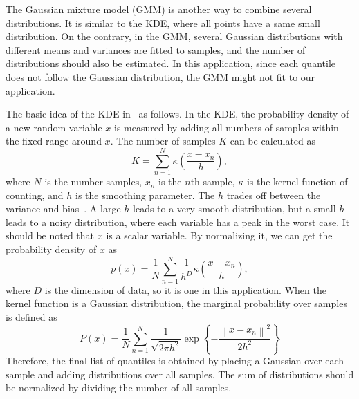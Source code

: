 \documentclass[journal]{IEEEtran} %
\begin{document}
The Gaussian mixture model (GMM) is another way to combine several distributions. It is similar to the KDE, where all points have a same small distribution. On the contrary, in the GMM, several Gaussian distributions with different means and variances are fitted to samples, and the number of distributions should also be estimated. In this application, since each quantile does not follow the Gaussian distribution, the GMM might not fit to our application.





The basic idea of the KDE in~\cite{Duda} as follows. In the KDE, the probability density of a new random variable $x$ is measured by adding all numbers of samples within the fixed range around $x$. The number of samples $K$ can be calculated as
\begin{equation}
\label{K}
K = \sum\limits_{n = 1}^N {\kappa  \left( {\frac{{x - {x_n}}}{h}} \right)},
\end{equation}
where $N$ is the number samples, $x_n$ is the $n$th sample, $\kappa$ is the kernel function of counting, and $h$ is the smoothing parameter. The $h$ trades off between the variance and bias~\cite{Bishop}. A large $h$ leads to a very smooth distribution, but a small $h$ leads to a noisy distribution, where each variable has a peak in the worst case.
It should be noted that $x$ is a scalar variable. By normalizing it, we can get the probability density of $x$ as
\begin{equation}
\label{K_PDF}
p(x) = \frac{1}{N}\sum\limits_{n = 1}^N {\frac{1}{{{h^D}}}\kappa \left( {\frac{{x - {x_n}}}{h}} \right)},
\end{equation}
where $D$ is the dimension of data, so it is one in this application.
When the kernel function is a Gaussian distribution, the marginal probability over samples is defined as
\begin{equation}
\label{GaussianCase}
P(x) = \frac{1}{N}\sum\limits_{n = 1}^N {\frac{1}{{\sqrt {2\pi {h^2}} }}\exp \left\{ { - \frac{{{{\left\| {x - {x_n}} \right\|}^2}}}{{2{h^2}}}} \right\}}
\end{equation}
Therefore, the final list of quantiles is obtained by placing a Gaussian over each sample and adding distributions over all samples. The sum of distributions should be normalized by dividing the number of all samples.


\end{document}
